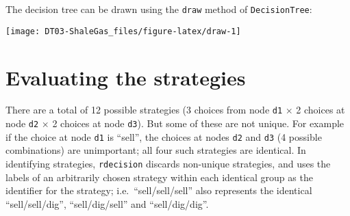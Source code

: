 \documentclass[
]{article}
\newenvironment{Shaded}{\begin{snugshade}}{\end{snugshade}}
\newcommand{\AttributeTok}[1]{\textcolor[rgb]{0.77,0.63,0.00}{#1}}
\newcommand{\CommentTok}[1]{\textcolor[rgb]{0.56,0.35,0.01}{\textit{#1}}}
\newcommand{\DecValTok}[1]{\textcolor[rgb]{0.00,0.00,0.81}{#1}}
\newcommand{\FunctionTok}[1]{\textcolor[rgb]{0.00,0.00,0.00}{#1}}
\newcommand{\NormalTok}[1]{#1}
\newcommand{\OtherTok}[1]{\textcolor[rgb]{0.56,0.35,0.01}{#1}}
\newcommand{\SpecialCharTok}[1]{\textcolor[rgb]{0.00,0.00,0.00}{#1}}
\newcommand{\StringTok}[1]{\textcolor[rgb]{0.31,0.60,0.02}{#1}}
\begin{document}
\begin{Shaded}
\end{Shaded}

The decision tree can be drawn using the \texttt{draw} method of
\texttt{DecisionTree}:

\begin{center}\texttt{[image: DT03-ShaleGas\_files/figure-latex/draw-1]} \end{center}

\hypertarget{evaluating-the-strategies}{%
\section{Evaluating the strategies}\label{evaluating-the-strategies}}

There are a total of 12 possible strategies (3 choices from node
\texttt{d1} \(\times\) 2 choices at node \texttt{d2} \(\times\) 2
choices at node \texttt{d3}). But some of these are not unique. For
example if the choice at node \texttt{d1} is ``sell'', the choices at
nodes \texttt{d2} and \texttt{d3} (4 possible combinations) are
unimportant; all four such strategies are identical. In identifying
strategies, \texttt{rdecision} discards non-unique strategies, and uses
the labels of an arbitrarily chosen strategy within each identical group
as the identifier for the strategy; i.e.~``sell/sell/sell'' also
represents the identical ``sell/sell/dig'', ``sell/dig/sell'' and
``sell/dig/dig''.
\end{document}
